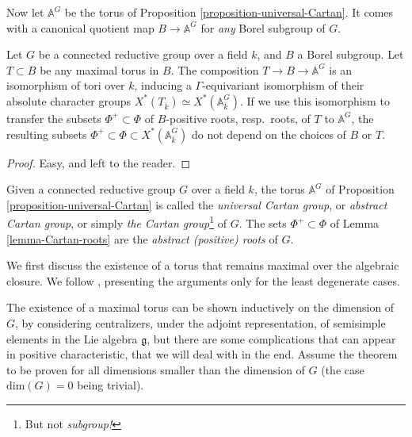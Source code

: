 Now let $\mathbb A^G$ be the torus of Proposition \ref{proposition-universal-Cartan}. It comes with a canonical quotient map $B\to \mathbb A^G$ for \emph{any} Borel subgroup of $G$.

\begin{lemma}
\label{lemma-Cartan-roots}
 Let $G$ be a connected reductive group over a field $k$, and $B$ a Borel subgroup. Let $T\subset B$ be any maximal torus in $B$. The composition $T\to B\to \mathbb A^G$ is an isomorphism of tori over $k$, inducing a $\Gamma$-equivariant isomorphism of their absolute character groups $X^*(T_{\bar k})\simeq X^*(\mathbb A^G_{\bar k})$. If we use this isomorphism to transfer the subsets $\Phi^+\subset \Phi$ of $B$-positive roots, resp.\ roots, of $T$ to $\mathbb A^G$, the resulting subsets $\Phi^+\subset \Phi\subset X^*(\mathbb A^G_{\bar k})$ do not depend on the choices of $B$ or $T$.
\end{lemma}

\begin{proof}
 Easy, and left to the reader.
\end{proof}




\begin{definition}
 \label{definition-universal-Cartan}
Given a connected reductive group $G$ over a field $k$, the torus $\mathbb A^G$ of Proposition \ref{proposition-universal-Cartan} is called the {\it universal Cartan group}, or {\it abstract Cartan group}, or simply {\it the Cartan group}\footnote{But not \emph{subgroup!}} of $G$. The sets $\Phi^+\subset \Phi$ of Lemma \ref{lemma-Cartan-roots} are the {\it abstract (positive) roots} of $G$. 
\end{definition}



















We first discuss the existence of a torus that remains maximal over the algebraic closure. We follow \cite[Theorem 18.2]{Borel-LAG}, presenting the arguments only for the least degenerate cases.
 
 The existence of a maximal torus can be shown inductively on the dimension of $G$, by considering centralizers, under the adjoint representation, of semisimple elements in the Lie algebra $\mathfrak g$, but there are some complications that can appear in positive characteristic, that we will deal with in the end. Assume the theorem to be proven for all dimensions smaller than the dimension of $G$ (the case $\text{dim}(G)=0$ being trivial).
 
